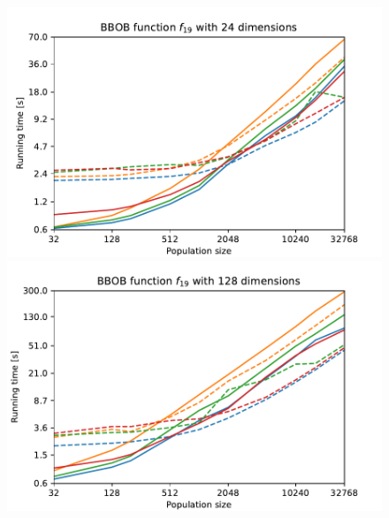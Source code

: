 \begin{figure}[ht!]
    \begin{minipage}[t]{0.32\textwidth}
        \centering
        \includegraphics[width=\textwidth]{img/runs/time_es_mutation_fn19_24d.pdf}
    \end{minipage}
    \hfill
    \begin{minipage}[t]{0.32\textwidth}
        \centering
        \includegraphics[width=\textwidth]{img/runs/time_es_mutation_fn19_128d.pdf}
    \end{minipage}
    \hfill
    \begin{minipage}[t]{0.32\textwidth}
        \centering

\end{minipage}
\end{figure}
